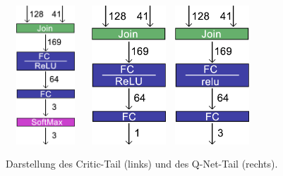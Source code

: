 \begin{figure}[H]
	\centering
	\includegraphics[width=3cm, height=5.2cm]{Abbildungen/Actor.png}
	\hspace{.1\linewidth}%
	\includegraphics[width=3cm, height=5.2cm]{Abbildungen/Critic.png}
	\hspace{.1\linewidth}%
	\includegraphics[width=3cm, height=5.2cm]{Abbildungen/QNet.png}
	\caption[Critic- und Q-Net-Tail]{Darstellung des Critic-Tail (links) und des Q-Net-Tail (rechts).}
	\label{fig:Critic_Q_Tail}
\end{figure}

